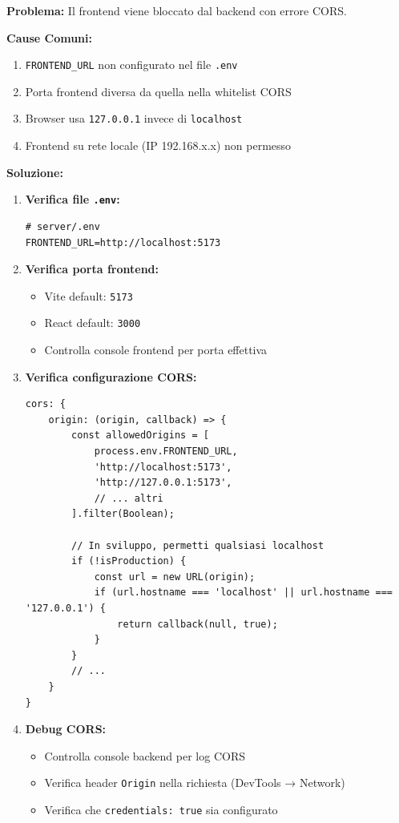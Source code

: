 \documentclass[11pt,a4paper]{article}
\newcommand{\code}[1]{\texttt{#1}}
\begin{document}
\textbf{Problema:} Il frontend viene bloccato dal backend con errore CORS.

\textbf{Cause Comuni:}
\begin{enumerate}
    \item \code{FRONTEND\_URL} non configurato nel file \code{.env}
    \item Porta frontend diversa da quella nella whitelist CORS
    \item Browser usa \code{127.0.0.1} invece di \code{localhost}
    \item Frontend su rete locale (IP 192.168.x.x) non permesso
\end{enumerate}

\textbf{Soluzione:}

\begin{enumerate}
    \item \textbf{Verifica file \code{.env}:}
    \begin{lstlisting}
# server/.env
FRONTEND_URL=http://localhost:5173
    \end{lstlisting}
    
    \item \textbf{Verifica porta frontend:}
    \begin{itemize}
        \item Vite default: \code{5173}
        \item React default: \code{3000}
        \item Controlla console frontend per porta effettiva
    \end{itemize}
    
    \item \textbf{Verifica configurazione CORS:}
    \begin{lstlisting}[caption=server/config/security.js]
cors: {
    origin: (origin, callback) => {
        const allowedOrigins = [
            process.env.FRONTEND_URL,
            'http://localhost:5173',
            'http://127.0.0.1:5173',
            // ... altri
        ].filter(Boolean);
        
        // In sviluppo, permetti qualsiasi localhost
        if (!isProduction) {
            const url = new URL(origin);
            if (url.hostname === 'localhost' || url.hostname === '127.0.0.1') {
                return callback(null, true);
            }
        }
        // ...
    }
}
    \end{lstlisting}
    
    \item \textbf{Debug CORS:}
    \begin{itemize}
        \item Controlla console backend per log CORS
        \item Verifica header \code{Origin} nella richiesta (DevTools → Network)
        \item Verifica che \code{credentials: true} sia configurato
    \end{itemize}
    

\end{enumerate}
\end{document}
